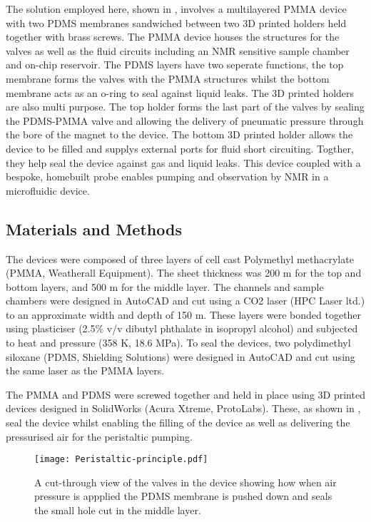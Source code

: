The solution employed here, shown in , involves a multilayered PMMA device
with two PDMS membranes sandwiched between two 3D printed holders held together with brass
screws. The PMMA device houses the structures for the valves as well as the fluid circuits
including an NMR sensitive sample chamber and on-chip reservoir. The PDMS layers have two
seperate functions, the top membrane forms the valves with the PMMA structures whilst the
bottom membrane acts as an o-ring to seal against liquid leaks. The 3D printed holders
are also multi purpose. The top holder forms the last part of the valves by sealing the
PDMS-PMMA valve and allowing the delivery of pneumatic pressure through the bore of the
magnet to the device. The bottom 3D printed holder allows the device to be filled and
supplys external ports for fluid short circuiting. Togther, they help seal the device
against gas and liquid leaks. This device coupled with a bespoke, homebuilt probe enables
pumping and observation by NMR in a microfluidic device.


\subsection{Materials and Methods}

The devices were composed of three layers of cell cast Polymethyl methacrylate (PMMA,
Weatherall Equipment). The sheet thickness was 200 \mu m for the top and bottom layers, and 500 \mu m for
the middle layer. The channels and sample chambers were designed in
AutoCAD and cut using a CO2 laser (HPC Laser ltd.) to an approximate width and depth
of 150 \mu m. These layers were bonded together using plasticiser (2.5\% v/v dibutyl
phthalate in isopropyl alcohol) and subjected to heat and pressure (358 K, 18.6 MPa).
To seal the devices, two polydimethyl siloxane (PDMS, Shielding Solutions) were
designed in AutoCAD and cut using the same laser as the PMMA layers.

The PMMA and PDMS were screwed together and held in place using 3D printed devices
designed in SolidWorks (Acura Xtreme, ProtoLabs). These, as shown in , seal the
device whilst enabling the filling of the device as well as delivering the pressurised
air for the peristaltic pumping.

\begin{figure}
  \begin{center}
  \texttt{[image: Peristaltic-principle.pdf]}
  \caption{A cut-through view of the valves in the device showing how when air pressure is
  appplied the PDMS membrane is pushed down and seals the small hole cut in the middle layer.}
  \label{fig:PP-device}
  \end{center}
\end{figure}

